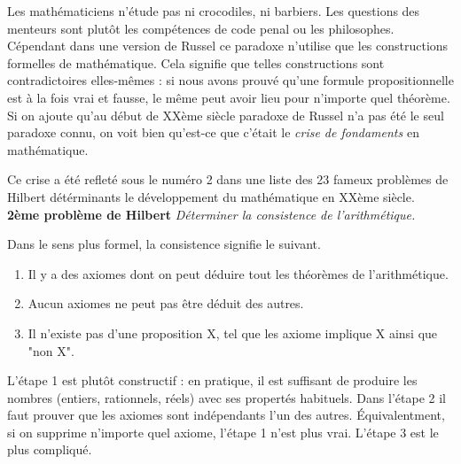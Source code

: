 \documentclass[12pt, a4paper]{article}
\newtheorem*{problem}{Problème}
\begin{document}
Les mathématiciens n'étude pas ni crocodiles, ni barbiers.
Les questions des menteurs sont plutôt les compétences de code penal ou les philosophes.
Cépendant dans une version de Russel ce paradoxe n'utilise que les constructions formelles de mathématique. Cela signifie que telles constructions sont contradictoires elles-mêmes : si nous avons prouvé qu'une formule propositionnelle est à la fois vrai et fausse, le même peut avoir lieu pour n'importe quel théorème.
Si on ajoute qu'au début de XXème siècle paradoxe de Russel n'a pas été le seul paradoxe connu, on voit bien qu'est-ce que c'était le \emph{crise de fondaments} en mathématique.

Ce crise a été refleté sous le numéro 2 dans une liste des 23 fameux problèmes de Hilbert détérminants le développement du mathématique en XXème siècle. \\
\textbf{2ème problème de Hilbert}
\textit{Déterminer la consistence de l'arithmétique.}

Dans le sens plus formel, la consistence signifie le suivant.
\begin{enumerate}
	\item Il y a des axiomes dont on peut déduire tout les théorèmes de l'arithmétique.
	\item Aucun axiomes ne peut pas être déduit des autres.
	\item Il n'existe pas d'une proposition X, tel que les axiome implique X ainsi que "non X".
\end{enumerate}
L'étape 1 est plutôt constructif : en pratique, il est suffisant de produire les nombres (entiers, rationnels, réels) avec ses propertés habituels.
Dans l'étape 2 il faut prouver que les axiomes sont indépendants l'un des autres.
Équivalentment, si on supprime n'importe quel axiome, l'étape 1 n'est plus vrai.
L'étape 3 est le plus compliqué.
\end{document}
